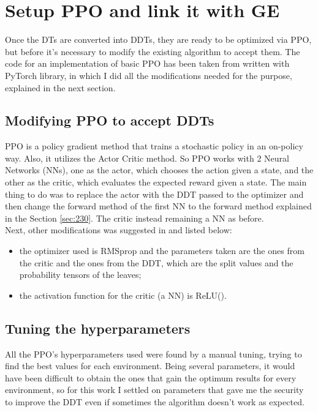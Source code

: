 \chapter{Setup PPO and link it with GE}
\label{cha:300}
Once the DTs are converted into DDTs, they are ready to be optimized via PPO, but before it's necessary to modify the existing algorithm to accept them. The code for an implementation of basic PPO has been taken from \cite{barhate} written with PyTorch library, in which I did all the modifications needed for the purpose, explained in the next section.
 
 
\section{Modifying PPO to accept DDTs}
\label{sec:310}
PPO is a policy gradient method that trains a stochastic policy in an on-policy way. Also, it utilizes the Actor Critic method. So PPO works with 2 Neural Networks (NNs), one as the actor, which chooses the action given a state, and the other as the critic, which evaluates the expected reward given a state. The main thing to do was to replace the actor with the DDT passed to the optimizer and then change the forward method of the first NN to the forward method explained in the Section \ref{sec:230}. The critic instead remaining a NN as before.\\
Next, other modifications was suggested in \cite{silva} and listed below:
\begin{itemize}
    \item the optimizer used is RMSprop and the parameters taken are the ones from the critic and the ones from the DDT, which are the split values and the probability tensors of the leaves;
    \item the activation function for the critic (a NN) is ReLU().
\end{itemize}



\section{Tuning the hyperparameters}
\label{sec:320}
All the PPO's hyperparameters used were found by a manual tuning, trying to find the best values for each environment. Being several parameters, it would have been difficult to obtain the ones that gain the optimum results for every environment, so for this work I settled on parameters that gave me the security to improve the DDT even if sometimes the algorithm doesn't work as expected.

